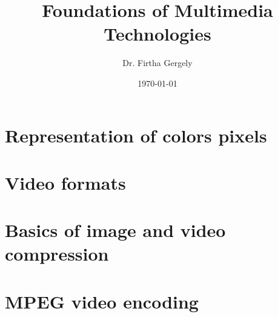 \documentclass{book}
\title{Foundations of Multimedia Technologies}
\author{Dr. Firtha Gergely}
\date{\today}
\begin{document}
\sloppy 


\titlepage
\maketitle
\cleardoublepage 
  
\tableofcontents

\setcounter{page}{1}			%


\chapter{Representation of colors pixels}
\label{sec:video_color_representation}
 

\chapter{Video formats}
\label{sec:video_formats}
 

\chapter{Basics of image and video compression}
\label{sec:compression}
 

\chapter{MPEG video encoding}
\label{sec:MPEG}
 
\end{document}

